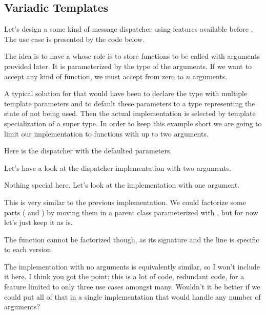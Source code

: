 \subsection{Variadic Templates}
\label{variadic-template}

Let's design a some kind of message dispatcher using features
available before . The use case is presented by the code below.



The idea is to have a  whose role is to store
functions to be called with arguments provided later. It is
parameterized by the type of the arguments. If we want to accept any
kind of function, we must accept from zero to $n$ arguments.

A typical solution for that would have been to declare the type with
multiple template parameters and to default these parameters to a type
representing the state of not being used. Then the actual
implementation is selected by template specialization of a super
type. In order to keep this example short we are going to limit our
implementation to functions with up to two arguments.

Here is the dispatcher with the defaulted parameters.



Let's have a look at the dispatcher implementation with two arguments.



Nothing special here. Let's look at the implementation with one
argument.



This is very similar to the previous implementation. We could
factorize some parts ( and ) by
moving them in a parent class parameterized with
, but for now let's just keep it as is.

The  function cannot be factorized though, as its
signature and the  line is specific to
each version.

The implementation with no arguments is equivalently similar, so I
won't include it here. I think you got the point: this is a lot of
code, redundant code, for a feature limited to only three use cases
amongst many. Wouldn't it be better if we could put all of that in a
single implementation that would handle any number of arguments?

